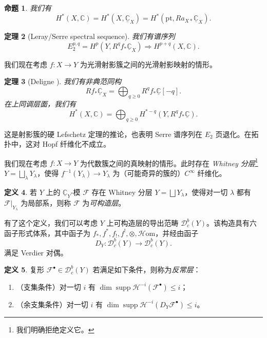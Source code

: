 \documentclass{amsart}
\newtheorem{thm}{定理}[section]
\newtheorem{prop}[thm]{命题}
\theoremstyle{definition}
\newtheorem{defn}[thm]{定义}
\theoremstyle{remark}
\theoremstyle{plain}
\theoremstyle{definition}
\theoremstyle{remark}
\newcommand{\C}{\mathbb{C}}
\newcommand{\mc}[1]{\mathcal{#1}}
\newcommand{\mr}[1]{\mathrm{#1}}
\newcommand{\on}[1]{\operatorname{#1}}
\newcommand{\ul}[1]{\underline{#1}}
\newcommand{\1}{\mathbf{1}}
\newcommand{\2}{\mathbf{2}}
\newcommand{\3}{\mathbf{3}}
\begin{document}
\begin{prop}
    我们有
    \[ H^*(X, \C) = H^*(X, \ul{\C}_X) = H^*(\mr{pt}, R a_{X*} \ul{\C}_X). \]
\end{prop}

\begin{thm}[Leray/Serre spectral sequence]
    我们有谱序列
    \[ E_2^{p,q} = H^p(Y, R^q f_* \ul{\C}_X) \Rightarrow H^{p+q}(X, \C). \]
\end{thm}

我们现在考虑 \(f \colon X \to Y\) 为光滑射影簇之间的光滑射影映射的情形。

\begin{thm}[Deligne {\cite{Deligne1968}}]
    我们有非典范同构
    \[ R f_* \ul{\C}_X = \bigoplus_{q \geq 0} R^q f_* \ul{\C}[-q]. \]
    在上同调层面，我们有
    \[ H^*(X, \C) = \bigoplus_{q \geq 0} H^{*-q}(Y, R^q f_* \ul{\C}). \]
\end{thm}

这是射影簇的硬 Lefschetz 定理的推论，也表明 Serre 谱序列在 \(E_2\) 页退化。在拓扑中，这对 Hopf 纤维化不成立。

我们现在考虑 \(f \colon X \to Y\) 为代数簇之间的真映射的情形。此时存在 \textit{Whitney 分层}\footnote{我们明确拒绝定义它。} \(Y = \bigsqcup_{\lambda} Y_{\lambda}\)，使得 \(f^{-1}(Y_{\lambda}) \to Y_{\lambda}\) 为（可能奇异的簇的）\(C^{\infty}\) 纤维化。

\begin{defn}
    若 \(Y\) 上的 \(\ul{\C}_Y\)-模 \(\mc{F}\) 存在 Whitney 分层 \(Y = \bigsqcup Y_{\lambda}\)，使得对一切 \(\lambda\) 都有 \(\mc{F}|_{Y_{\lambda}}\) 为局部系，则称 \(\mc{F}\) 为\textit{可构造层}。
\end{defn}

有了这个定义，我们可以考虑 \(Y\) 上可构造层的导出范畴 \(\mc{D}_c^b(Y)\)。该构造具有六函子形式体系，其中函子为 \(f_*, f^*, f_!, f^!, \otimes, \mc{H}\mr{om}\)，并经由函子
\[ D_Y \colon \mc{D}_c^b(Y) \to \mc{D}_c^b(Y). \]
满足 Verdier 对偶。

\begin{defn}
    复形 \(\mc{F}^{\bullet} \in \mc{D}_c^b(Y)\) 若满足如下条件，则称为\textit{反常层}：
    \begin{enumerate}
        \item （支集条件）对一切 \(i\) 有 \(\dim \on{supp} \mc{H}^{-i}(\mc{F}^{\bullet}) \leq i\)；
        \item （余支集条件）对一切 \(i\) 有 \(\dim \on{supp} \mc{H}^{-i}(D_Y \mc{F}^{\bullet}) \leq i\)。
    \end{enumerate}
\end{defn}
\end{document}
